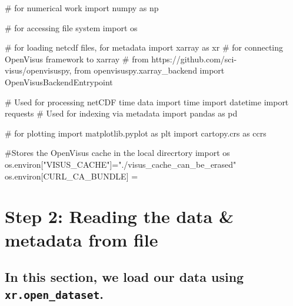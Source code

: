 \documentclass[
  letterpaper,
  DIV=11,
  numbers=noendperiod]{scrreprt}
\newenvironment{Shaded}{\begin{snugshade}}{\end{snugshade}}
\newcommand{\CommentTok}[1]{\textcolor[rgb]{0.37,0.37,0.37}{#1}}
\newcommand{\ImportTok}[1]{\textcolor[rgb]{0.00,0.46,0.62}{#1}}
\newcommand{\NormalTok}[1]{\textcolor[rgb]{0.00,0.23,0.31}{#1}}
\newcommand{\OperatorTok}[1]{\textcolor[rgb]{0.37,0.37,0.37}{#1}}
\newcommand{\StringTok}[1]{\textcolor[rgb]{0.13,0.47,0.30}{#1}}
\begin{document}
\begin{Shaded}
\begin{Highlighting}[]
\CommentTok{\# for numerical work}
\ImportTok{import}\NormalTok{ numpy }\ImportTok{as}\NormalTok{ np}

\CommentTok{\# for accessing file system}
\ImportTok{import}\NormalTok{ os}

\CommentTok{\# for loading netcdf files, for metadata}
\ImportTok{import}\NormalTok{ xarray }\ImportTok{as}\NormalTok{ xr}
\CommentTok{\# for connecting OpenVisus framework to xarray}
\CommentTok{\# from https://github.com/sci{-}visus/openvisuspy, }
\ImportTok{from}\NormalTok{ openvisuspy.xarray\_backend }\ImportTok{import}\NormalTok{ OpenVisusBackendEntrypoint}

\CommentTok{\# Used for processing netCDF time data}
\ImportTok{import}\NormalTok{ time}
\ImportTok{import}\NormalTok{ datetime}
\ImportTok{import}\NormalTok{ requests}
\CommentTok{\# Used for indexing via metadata}
\ImportTok{import}\NormalTok{ pandas }\ImportTok{as}\NormalTok{ pd}

\CommentTok{\# for plotting}
\ImportTok{import}\NormalTok{ matplotlib.pyplot }\ImportTok{as}\NormalTok{ plt}
\ImportTok{import}\NormalTok{ cartopy.crs }\ImportTok{as}\NormalTok{ ccrs}


\CommentTok{\#Stores the OpenVisus cache in the local direcrtory }
\ImportTok{import}\NormalTok{ os}
\NormalTok{os.environ[}\StringTok{"VISUS\_CACHE"}\NormalTok{]}\OperatorTok{=}\StringTok{"./visus\_cache\_can\_be\_erased"}
\NormalTok{os.environ[}\StringTok{\textquotesingle{}CURL\_CA\_BUNDLE\textquotesingle{}}\NormalTok{] }\OperatorTok{=} \StringTok{\textquotesingle{}\textquotesingle{}}
\end{Highlighting}
\end{Shaded}

\section{\texorpdfstring{\textbf{Step 2: Reading the data \& metadata
from
file}}{Step 2: Reading the data \& metadata from file}}\label{step-2-reading-the-data-metadata-from-file}

\subsection{\texorpdfstring{In this section, we load our data using
\texttt{xr.open\_dataset}.}{In this section, we load our data using xr.open\_dataset.}}\label{in-this-section-we-load-our-data-using-xr.open_dataset.}
\end{document}
